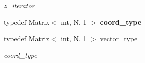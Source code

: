 \begin{DoxyCompactItemize}
\begin{DoxyCompactList}\small\item\em z\-\_\-iterator \end{DoxyCompactList}\item 
\hypertarget{class_d_o_1_1_locator_ae4fb477425bbeb20329d300396ac2582}{typedef Matrix$<$ int, N, 1 $>$ {\bfseries coord\-\_\-type}}\label{class_d_o_1_1_locator_ae4fb477425bbeb20329d300396ac2582}

\item 
\hypertarget{class_d_o_1_1_locator_aacf98e49e90f9aeead0ff8885fae3ac7}{typedef Matrix$<$ int, N, 1 $>$ \hyperlink{class_d_o_1_1_locator_aacf98e49e90f9aeead0ff8885fae3ac7}{vector\-\_\-type}}\label{class_d_o_1_1_locator_aacf98e49e90f9aeead0ff8885fae3ac7}

\begin{DoxyCompactList}\small\item\em coord\-\_\-type \end{DoxyCompactList}\end{DoxyCompactItemize}
